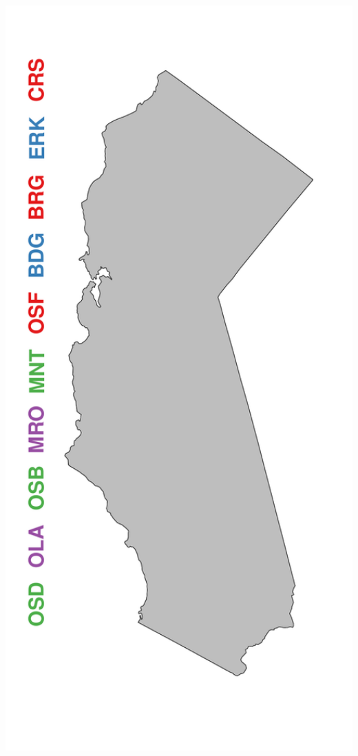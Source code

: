 \documentclass[ xcolor = pdftex, dvipsnames, table ]{beamer}
\begin{document}
\begin{frame}
{\begin{minipage}[h!]{0.19\textwidth}
\end{minipage}
\begin{minipage}[h!]{0.19\textwidth}
        \hspace*{0.25cm}
        \includegraphics[width=1.2\textwidth]{../pictures/mapLeapFrog.pdf}

\end{minipage}}
\end{frame}
\end{document}
